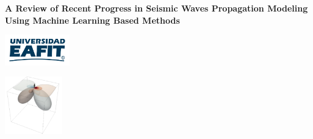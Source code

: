 \documentclass[11pt,twoside]{article}
\begin{document}
\thispagestyle{empty}  


\begin{tcolorbox}[colback=white!20,colframe=gray!20,sharp corners]

\vspace{-2mm} 
\begin{minipage}{9.5cm}
    \begin{center}
        \textbf{\large A Review of Recent Progress in Seismic Waves Propagation Modeling Using 
        Machine Learning Based Methods}  
    \end{center}                 
\end{minipage} 
\begin{minipage}{3.1cm}
    \begin{center}
        \hspace{-0.2cm}\includegraphics[width=2.8cm]{figs/format/logo_EAFIT.pdf}
    \end{center}
\end{minipage}    
\begin{minipage}{2.2cm}
    \begin{center}
        \includegraphics[width=2.5cm]{figs/format/logo_grupo.pdf}
    \end{center}
\end{minipage}
\vspace{-2mm} 
\end{tcolorbox}
\end{document}
